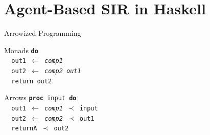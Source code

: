 \documentclass{beamer}
\begin{document}
%

%

\section{Agent-Based SIR in Haskell}
\begin{frame}{Arrowized Programming}
\begin{block}{Monads}
\texttt{\textbf{do} \\
\hspace{\parindent} \, out1 $\leftarrow$ \textit{comp1} \\
\hspace{\parindent} \, out2 $\leftarrow$ \textit{comp2 out1} \\
\hspace{\parindent} \, return out2}
\end{block}
	
\begin{block}{Arrows}
\texttt{\textbf{proc} input \textbf{do} \\
\hspace{\parindent} \, out1 $\leftarrow$ \textit{comp1} $\prec$ input \\
\hspace{\parindent} \, out2 $\leftarrow$ \textit{comp2} $\prec$ out1 \\
\hspace{\parindent} \, returnA $\prec$ out2}
\end{block}
\end{frame}
\end{document}
